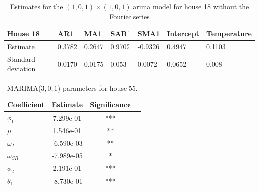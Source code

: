 \begin{table}[H]
    \begin{tabular}{|l|l|l|l|l|l|l|}
    \hline
    House 18           & AR1    & MA1    & SAR1   & SMA1    & Intercept & Temperature \\ \hline
    Estimate           & 0.3782 & 0.2647 & 0.9702 & -0.9326 & 0.4947    & 0.1103      \\ \hline
    Standard deviation & 0.0170 & 0.0175 & 0.053  & 0.0072  & 0.0652    & 0.008       \\ \hline
    \end{tabular}
    \caption{Estimates for the $(1,0,1)\times(1,0,1)$ arima model for house 18 without the Fourier series}
    \label{tab:model1_param18}
    \end{table}

    \begin{table}[H]
        \centering
        \begin{tabular}{l|ccc}
        \hline
        Coefficient & Estimate & Significance\\ \hline \hline
        $\phi_1$ & 7.299e-01 & *** \\
        $\mu$ & 1.546e-01 & ** \\
        $\omega_{T}$ & -6.590e-03 & ** \\
        $\omega_{SR}$ & -7.989e-05 & * \\
        $\phi_2$ & 2.191e-01 &  *** \\
        $\theta_1$ & -8.730e-01 & *** \\
        \hline
        \end{tabular}
        \caption{MARIMA($3,0,1$) parameters for house 55.}
        \label{tab: MARIMAparam55}
     \end{table}
    
